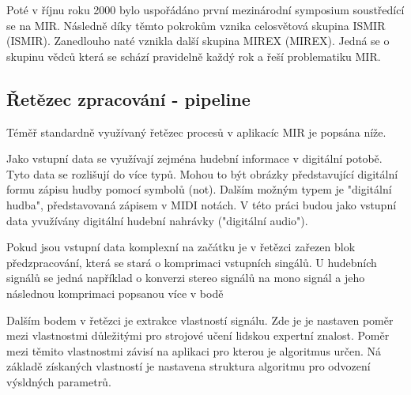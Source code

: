     Poté v říjnu roku 2000 bylo uspořádáno první mezinárodní symposium soustředící se na \acs*{MIR}.
    Následně díky těmto pokrokům vznika celosvětová skupina \acs{ISMIR} (\acl{ISMIR}).
    Zanedlouho naté vznikla další skupina \acs{MIREX} (\acl{MIREX}). Jedná se o skupinu vědců která se schází pravidelně každý rok a řeší problematiku \acs{MIR}.
    
   \subsection{Řetězec zpracování - pipeline}

    Téměř standardně využívaný řetězec procesů v aplikacíc \acs{MIR} je popsána níže. 

    Jako vstupní data se využívají zejména hudební informace v digitální potobě.
    Tyto data se rozlišují do více typů. Mohou to být obrázky představující digitální formu zápisu hudby pomocí symbolů (not).
    Dalším možným typem je "digitální hudba", představovaná zápisem v \acs{MIDI} notách.
    V této práci budou jako vstupní data yvužívány digitální hudební nahrávky ("digitální audio"). 

    Pokud jsou vstupní data komplexní na začátku je v řetězci zařezen blok předzpracování, která se stará o komprimaci vstupních singálů.
    U hudebních signálů se jedná například o konverzi stereo signálů na mono signál
    a jeho následnou komprimaci popsanou více v bodě 

    Dalším bodem v řetězci je extrakce vlastností signálu. 
    Zde je je nastaven poměr mezi vlastnostmi důležitými pro strojové učení lidskou expertní znalost.
    Poměr mezi těmito vlastnostmi závisí na aplikaci pro kterou je algoritmus určen.
    Ná základě získaných vlastností je nastavena struktura algoritmu pro odvození výsldných parametrů.

